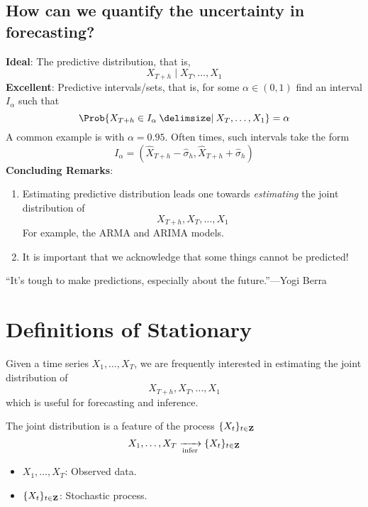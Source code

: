 \subsection*{How can we quantify the uncertainty in forecasting?}
\textbf{Ideal}: The predictive distribution, that is,
\[ X_{T+h}\mid X_T,\ldots,X_1 \]
\textbf{Excellent}: Predictive intervals/sets, that is, for some $ \alpha\in(0,1) $
find an interval $ I_\alpha $ such that
\[ \Prob{X_{T+h}\in I_\alpha\given X_T,\ldots,X_1}=\alpha \]
A common example is with $ \alpha=0.95 $. Often times, such intervals take the form
\[ I_\alpha=(\hat{X}_{T+h}-\hat{\sigma}_h,\hat{X}_{T+h}+\hat{\sigma}_h) \]
\textbf{Concluding Remarks}:
\begin{enumerate}
    \item Estimating predictive distribution leads one towards
          \emph{estimating} the joint distribution of
          \[ X_{T+h},X_T,\ldots,X_1 \]
          For example, the ARMA and ARIMA models.
    \item It is important that we acknowledge that some things cannot be predicted!
\end{enumerate}
``It's tough to make predictions, especially about the future.''---Yogi Berra

\section{Definitions of Stationary}
Given a time series $ X_1,\ldots,X_T $, we are
frequently interested in estimating the joint distribution of
\[ X_{T+h},X_T,\ldots,X_1 \]
which is useful for forecasting and inference.

The joint distribution is a feature of the process
$ \{X_{t}\}_{t\in\mathbf{Z}} $
\[ X_1,\ldots,X_T\xrightarrow[\text{infer}]{}\{X_t\}_{t\in\mathbf{Z}} \]
\begin{itemize}
    \item $ X_1,\ldots,X_T $: Observed data.
    \item $ \{X_t\}_{t\in\mathbf{Z}} $: Stochastic process.
\end{itemize}

